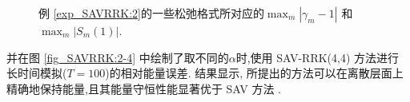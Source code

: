 \begin{figure}[H]
\begin{center}
\caption{例 \ref{exp_SAVRRK:2}的一些松弛格式所对应的$\max_m\left|\gamma_m-1\right|$ 和 $\max_m\left|S_m(1)\right|$.}
\label{fig_SAVRRK:2-1}
\end{center}
\end{figure}
并在图 \ref{fig_SAVRRK:2-4} 中绘制了取不同的$\alpha$时,使用 SAV-RRK(4,4) 方法进行长时间模拟($T=100$)的相对能量误差.
结果显示, 所提出的方法可以在离散层面上精确地保持能量,且其能量守恒性能显著优于 SAV 方法 \cite{chengConvergenceEnergyconservingScheme2022}.
